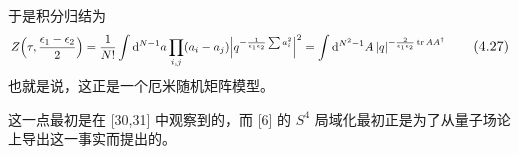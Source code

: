于是积分归结为
\begin{equation}
\resizebox{0.9\textwidth}{!}{$\displaystyle
Z\Big(\tau,\frac{\epsilon_1-\epsilon_2}{2}\Big)=\frac{1}{N!}\int\dd^{N-1}a\prod_{i,j}(a_i-a_j)\Big|q^{-\frac{1}{\epsilon_1\epsilon_2}\sum a_i^2}\Big|^2=\int\dd^{N^2-1}A\,|q|^{-\frac{2}{\epsilon_1\epsilon_2}\tr AA^\dagger}
$}
\tag{4.27}
\end{equation}
也就是说，这正是一个厄米随机矩阵模型。



这一点最初是在 [30,31] 中观察到的，而 [6] 的 $S^4$ 局域化最初正是为了从量子场论上导出这一事实而提出的。
